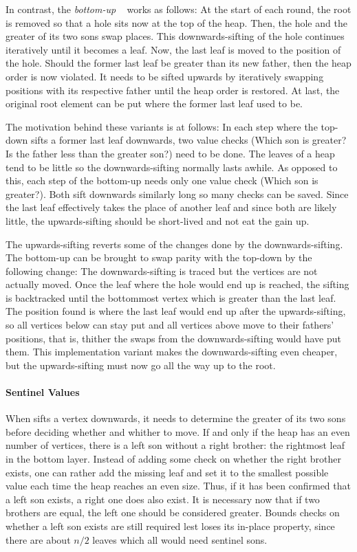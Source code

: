 In contrast, the \emph{bottom-up} \HS{}~\cite{wegener1993heapsort} works as follows:
At the start of each round, the root is removed so that a hole sits now at the top of the heap.
Then, the hole and the greater of its two sons swap places.
This downwards-sifting of the hole continues iteratively until it becomes a leaf.
Now, the last leaf is moved to the position of the hole.
Should the former last leaf be greater than its new father, then the heap order is now violated.
It needs to be sifted upwards by iteratively swapping positions with its respective father until the heap order is restored.
At last, the original root element can be put where the former last leaf used to be.

The motivation behind these variants is at follows:
In each step where the top-down \HS{} sifts a former last leaf downwards, two value checks (Which son is greater? Is the father less than the greater son?) need to be done.
The leaves of a heap tend to be little so the downwards-sifting normally lasts awhile.
As opposed to this, each step of the bottom-up \HS{} needs only one value check (Which son is greater?).
Both \HS*{} sift downwards similarly long so many checks can be saved.
Since the last leaf effectively takes the place of another leaf and since both are likely little, the upwards-sifting should be short-lived and not eat the gain up.

The upwards-sifting reverts some of the changes done by the downwards-sifting.
The bottom-up \HS{} can be brought to swap parity with the top-down \HS{} by the following change:
The downwards-sifting is traced but the vertices are not actually moved.
Once the leaf where the hole would end up is reached, the sifting is backtracked until the bottommost vertex which is greater than the last leaf.
The position found is where the last leaf would end up after the upwards-sifting, so all vertices below can stay put and all vertices above move to their fathers' positions, that is, thither the swaps from the downwards-sifting would have put them.
This implementation variant makes the downwards-sifting even cheaper, but the upwards-sifting must now go all the way up to the root.


\paragraph{Sentinel Values}
When \HS{} sifts a vertex downwards, it needs to determine the greater of its two sons before deciding whether and whither to move.
If and only if the heap has an even number of vertices, there is a left son without a right brother:
the rightmost leaf in the bottom layer.
Instead of adding some check on whether the right brother exists, one can rather add the missing leaf and set it to the smallest possible value each time the heap reaches an even size.
Thus, if it has been confirmed that a left son exists, a right one does also exist.
It is necessary now that if two brothers are equal, the left one should be considered greater.
Bounds checks on whether a left son exists are still required lest \HS{} loses its in-place property, since there are about \(n/2\) leaves which all would need sentinel sons.

